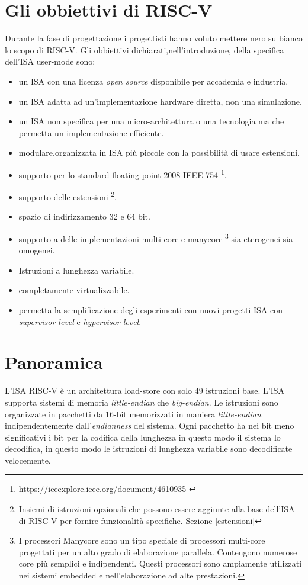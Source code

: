 \documentclass[12pt, a4paper]{report}
\begin{document}
\section{Gli obbiettivi di RISC-V}
Durante la fase di progettazione i progettisti hanno voluto mettere nero su bianco lo scopo di RISC-V. Gli obbiettivi dichiarati,nell'introduzione, della specifica dell'ISA user-mode sono:
\begin{itemize}
	\item un ISA con una licenza \textit{open source} disponibile per accademia e industria.
	\item un ISA adatta ad un'implementazione hardware diretta, non una simulazione.
	\item un ISA non specifica per una micro-architettura o una tecnologia ma che permetta un implementazione efficiente.
	\item modulare,organizzata in ISA più piccole con la possibilità di usare estensioni.
	\item supporto per lo standard floating-point 2008 IEEE-754 \footnote{ \url{https://ieeexplore.ieee.org/document/4610935} \cite{IEEE754-2008}}.
	\item supporto delle estensioni \footnote{Insiemi di istruzioni opzionali che possono essere aggiunte alla base dell'ISA di RISC-V per fornire funzionalità specifiche. Sezione \ref{estensioni}}.
	\item spazio di indirizzamento 32 e 64 bit.
	\item supporto a delle implementazioni multi core e manycore \footnote{I processori Manycore sono un tipo speciale di processori multi-core progettati per un alto grado di elaborazione parallela. Contengono numerose core più semplici e indipendenti. Questi processori sono ampiamente utilizzati nei sistemi embedded e nell'elaborazione ad alte prestazioni.} sia eterogenei sia omogenei.
	\item Istruzioni a lunghezza variabile.
	\item completamente virtualizzabile.
	\item permetta la semplificazione degli esperimenti con nuovi progetti ISA con \textit{supervisor-level} e \textit{hypervisor-level}. 
	
\end{itemize}

\section{Panoramica}
L'ISA RISC-V è un architettura load-store con solo 49 istruzioni base. L'ISA supporta sistemi di memoria \textit{little-endian} che \textit{big-endian}. Le istruzioni sono organizzate in pacchetti da 16-bit memorizzati in maniera \textit{little-endian} indipendentemente dall'\textit{endianness} del sistema. Ogni pacchetto ha nei bit meno significativi i bit per la codifica della lunghezza in questo modo il sistema lo decodifica, in questo modo le istruzioni di lunghezza variabile sono decodificate velocemente.
\end{document}
